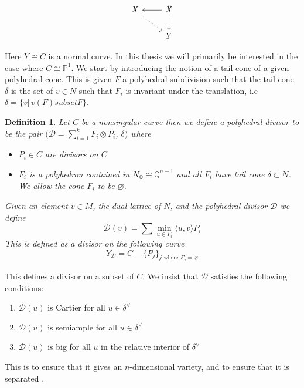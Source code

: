 \documentclass[12pt]{amsart}
\theoremstyle{plain}
\newtheorem{dfn}[thm]{Definition}
\begin{document}
\[
\begin{tikzcd}
X \arrow[rd, dotted] & \tilde{X} \arrow[l] \arrow[d]\\
& Y
\end{tikzcd}
\]

Here $Y \cong C$ is a normal curve. In this thesis we will primarily be interested in the case where $C \cong \mathbb{P}^1$. We start by introducing the notion of a tail cone of a given polyhedral cone. This is given $F$ a polyhedral subdivision such that the tail cone $\delta$ is the set of $v \in N$ such that $F_i$ is invariant under the translation, i.e $\delta = \{ v |\, v(F) subset F \}$.
\begin{dfn}
Let $C$ be a nonsingular curve then we define a polyhedral divisor to be the pair $(\mathcal{D} = \sum_{i = 1}^k F_i \otimes P_i$, $\delta)$ where
\begin{itemize}
\item $P_i \in C$ are divisors on $C$ 
\item $F_i$ is a polyhedron contained in $N_\mathbb{Q} \cong \mathbb{Q}^{n-1}$ and all $F_i$ have tail cone $\delta \subset N$.  We allow the cone $F_i$ to be $\varnothing$.
\end{itemize}
Given an element $v \in M$, the dual lattice of $N$, and the polyhedral divisor $\mathcal{D}$ we define
\[
\mathcal{D}(v) = \sum \min_{u \in F_i} \langle u, v \rangle P_i
\]
This is defined as a divisor on the following curve
\[
Y_\mathcal{D} = C - \{P_j\}_{j \text{ where } F_j = \varnothing}
\]
\end{dfn}

This defines a divisor on a subset of $C$. We insist that $\mathcal{D}$ satisfies the following conditions:
\begin{enumerate} 
\item $\mathcal{D}(u)$ is Cartier for all $u \in \delta^\vee $
\item $\mathcal{D}(u)$ is semiample for all $u \in \delta^\vee$
\item $\mathcal{D}(u)$ is big for all $u$ in the relative interior of $\delta^\vee$
\end{enumerate}
This is to ensure that it gives an $n$-dimensional variety, and to ensure that it is separated \cite{PS}.
\end{document}
